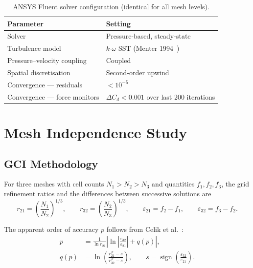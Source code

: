 \documentclass[12pt,a4paper]{article}
\begin{document}
\begin{table}[H]
\centering
\caption{ANSYS Fluent solver configuration (identical for all mesh levels).}
\label{tab:solver}
\begin{tabular}{ll}
\toprule
Parameter & Setting \\
\midrule
Solver & Pressure-based, steady-state \\
Turbulence model & $k$-$\omega$ SST (Menter 1994~\cite{menter1994}) \\
Pressure–velocity coupling & Coupled \\
Spatial discretisation & Second-order upwind \\
Convergence — residuals & $< 10^{-5}$ \\
Convergence — force monitors & $\Delta C_d < 0.001$ over last 200 iterations \\
\bottomrule
\end{tabular}
\end{table}

\section{Mesh Independence Study}
\label{sec:mesh_independence}

\subsection{GCI Methodology}

For three meshes with cell counts $N_1 > N_2 > N_3$ and quantities $f_1, f_2, f_3$, the grid
refinement ratios and the differences between successive solutions are
\begin{equation}
  r_{21} = \left(\frac{N_1}{N_2}\right)^{1/3}, \qquad
  r_{32} = \left(\frac{N_2}{N_3}\right)^{1/3}, \qquad
  \varepsilon_{21} = f_2 - f_1, \qquad
  \varepsilon_{32} = f_3 - f_2 .
\end{equation}

The apparent order of accuracy $p$ follows from Celik et al.~\cite{celik2008}:
\begin{align}
  p &= \frac{1}{\ln r_{21}}
       \left| \ln\left|\frac{\varepsilon_{32}}{\varepsilon_{21}}\right| + q(p) \right|, \\
  q(p) &= \ln\!\left( \frac{r_{21}^{\,p} - s}{r_{32}^{\,p} - s} \right), \qquad
  s = \operatorname{sign}\!\left(\frac{\varepsilon_{32}}{\varepsilon_{21}}\right).
\end{align}
\end{document}
